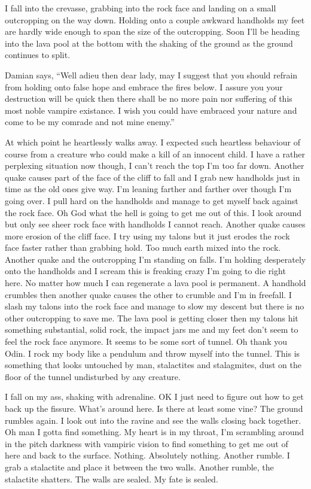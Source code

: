 I fall into the crevasse, grabbing into the rock face and landing on a small outcropping on the way down. Holding onto a couple awkward handholds my feet are hardly wide enough to span the size of the outcropping. Soon I'll be heading into the lava pool at the bottom with the shaking of the ground as the ground continues to split.

Damian says, ``Well adieu then dear lady, may I suggest that you should refrain from holding onto false hope and embrace the fires below. I assure you your destruction will be quick then there shall be no more pain nor suffering of this most noble vampire existance. I wish you could have embraced your nature and come to be my comrade and not mine enemy.''

At which point he heartlessly walks away. I expected such heartless behaviour of course from a creature who could make a kill of an innocent child. I have a rather perplexing situation now though, I can't reach the top I'm too far down. Another quake causes part of the face of the cliff to fall and I grab new handholds just in time as the old ones give way. I'm leaning farther and farther over though I'm going over. I pull hard on the handholds and manage to get myself back against the rock face. Oh God what the hell is going to get me out of this. I look around but only see sheer rock face with handholds I cannot reach. Another quake causes more erosion of the cliff face. I try using my talons but it just erodes the rock face faster rather than grabbing hold. Too much earth mixed into the rock. Another quake and the outcropping I'm standing on falls. I'm holding desperately onto the handholds and I scream this is freaking crazy I'm going to die right here. No matter how much I can regenerate a lava pool is permanent. A handhold crumbles then another quake causes the other to crumble and I'm in freefall. I slash my talons into the rock face and manage to slow my descent but there is no other outcropping to save me. The lava pool is getting closer then my talons hit something substantial, solid rock, the impact jars me and my feet don't seem to feel the rock face anymore. It seems to be some sort of tunnel. Oh thank you Odin. I rock my body like a pendulum and throw myself into the tunnel. This is something that looks untouched by man, stalactites and stalagmites, dust on the floor of the tunnel undisturbed by any creature.

I fall on my ass, shaking with adrenaline. OK I just need to figure out how to get back up the fissure. What's around here. Is there at least some vine? The ground rumbles again. I look out into the ravine and see the walls closing back together. Oh man I gotta find something. My heart is in my throat, I'm scrambling around in the pitch darkness with vampiric vision to find something to get me out of here and back to the surface. Nothing. Absolutely nothing. Another rumble. I grab a stalactite and place it between the two 
walls. Another rumble, the stalactite shatters. The walls are sealed. My fate is sealed.

